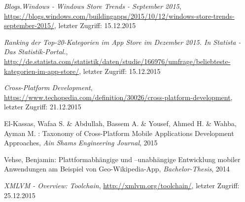 \begin{thebibliography}{}
\emph{Blogs.Windows - Windows Store Trends - September 2015},
\url{https://blogs.windows.com/buildingapps/2015/10/12/windows-store-trends-september-2015/}, letzter Zugriff: 15.12.2015

\emph{Ranking der Top-20-Kategorien im App Store im Dezember 2015. In Statista - Das Statistik-Portal.},
\url{http://de.statista.com/statistik/daten/studie/166976/umfrage/beliebteste-kategorien-im-app-store/}, letzter Zugriff: 15.12.2015

\emph{Cross-Platform Development},
\url{https://www.techopedia.com/definition/30026/cross-platform-development}, letzter Zugriff: 21.12.2015

El-Kassas, Wafaa S. \& Abdullah, Bassem A. \&  Yousef, Ahmed H. \&  Wahba, Ayman M. :
\glqq Taxonomy of Cross-Platform Mobile Applications Development Approaches\grqq, 
\emph{Ain Shams Engineering Journal}, 2015

Vehse, Benjamin:
\glqq Plattformabhängige und –unabhängige
Entwicklung mobiler Anwendungen am
Beispiel von Geo-Wikipedia-App\grqq, 
\emph{Bachelor-Thesis}, 2014

\emph{XMLVM - Overview: Toolchain},
\url{http://xmlvm.org/toolchain/}, letzter Zugriff: 25.12.2015

\end{thebibliography}
\clearpage\thispagestyle{empty}
\eigen  %
